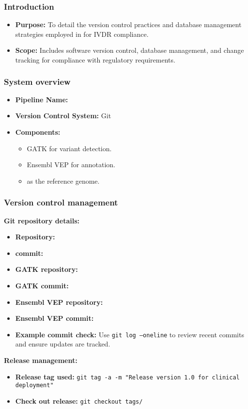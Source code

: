 \subsubsection{Introduction}
\begin{itemize}
    \item \textbf{Purpose:} To detail the version control practices and database management strategies employed in \dnasnake for IVDR compliance.\\
    \item \textbf{Scope:} Includes software version control, database management, and change tracking for compliance with regulatory requirements.
\end{itemize}

\subsubsection{System overview}
\begin{itemize}
    \item \textbf{Pipeline Name:} \dnasnake\\
    \item \textbf{Version Control System:} Git\\
    \item\textbf{Components:}
\begin{itemize}
    \item GATK for variant detection.
    \item Ensembl VEP for annotation.
    \item {} as the reference genome.
\end{itemize}
\end{itemize}

\subsubsection{Version control management}
\textbf{Git repository details:}
\begin{itemize}
    \item \textbf{\dnasnake Repository:} \gitRepoDNAsnake
     \item \textbf{\dnasnake commit:} \gitRepoDNAsnakeCommit
    \item \textbf{GATK repository:} \gitRepoGATK
	\item \textbf{GATK commit:} \gitRepoGATKCommit
    \item \textbf{Ensembl VEP repository:} \gitRepoVEP
	\item \textbf{Ensembl VEP commit:} \gitRepoVEPCommit
    \item \textbf{Example commit check:} Use \texttt{git log --oneline} to review recent commits and ensure updates are tracked.
\end{itemize}
\textbf{Release management:}
\begin{itemize}
    \item \textbf{Release tag used:} \texttt{git tag -a \gitRepoDNAsnakeTag -m "Release version 1.0 for clinical deployment"}
    \item \textbf{Check out release:} \texttt{git checkout tags/\gitRepoDNAsnakeTag}
\end{itemize}

